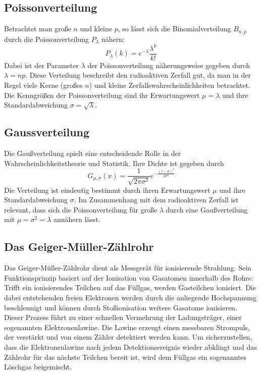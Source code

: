 \subsection{Poissonverteilung}
Betrachtet man große \(n\) und kleine \(p\), so lässt sich die Binomialverteilung \(B_{n,p}\) durch die Poissonverteilung \(P_\lambda\) nähern:
\begin{equation} \label{eq:poisson}
    P_\lambda(k) = e^{-\lambda} \frac{\lambda^k}{k!}
\end{equation}
Dabei ist der Parameter \(\lambda\) der Poissonverteilung näherungsweise gegeben durch \(\lambda = np\). Diese Verteilung beschreibt den radioaktiven Zerfall gut, da man in der Regel viele Kerne (großes \(n\)) und kleine Zerfallswahrscheinlichkeiten betrachtet. Die Kenngrößen der Poissonverteilung sind ihr Erwartungswert \(\mu = \lambda\) und ihre Standardabweichung \(\sigma = \sqrt{\lambda}\).

\subsection{Gaussverteilung}
Die Gaußverteilung spielt eine entscheidende Rolle in der Wahrscheinlichkeitstheorie und Statistik. Ihre Dichte ist gegeben durch
\begin{equation} \label{eq:gauss}
    G_{\mu,\sigma}(x) = \frac{1}{\sqrt{2\pi\sigma^2}} e^{-\frac{(x-\mu)^2}{2\sigma^2}}
\end{equation}
Die Verteilung ist eindeutig bestimmt durch ihren Erwartungswert \(\mu\) und ihre Standardabweichung \(\sigma\). Im Zusammenhang mit dem radioaktiven Zerfall ist relevant, dass sich die Poissonverteilung für große \(\lambda\) durch eine Gaußverteilung mit \(\mu = \sigma^2 = \lambda\) annähern lässt.

\FloatBarrier

\subsection{Das Geiger-Müller-Zählrohr}
Das Geiger-Müller-Zählrohr dient als Messgerät für ionisierende Strahlung. Sein Funktionsprinzip basiert auf der Ionisation von Gasatomen innerhalb des Rohrs: Trifft ein ionisierendes Teilchen auf das Füllgas, werden Gasteilchen ionisiert. Die dabei entstehenden freien Elektronen werden durch die anliegende Hochspannung beschleunigt und können durch Stoßionisation weitere Gasatome ionisieren. Dieser Prozess führt zu einer schnellen Vermehrung der Ladungsträger, einer sogenannten Elektronenlawine. Die Lawine erzeugt einen messbaren Strompuls, der verstärkt und von einem Zähler detektiert werden kann. Um sicherzustellen, dass die Elektronenlawine nach jedem Detektionsereignis wieder abklingt und das Zählrohr für das nächste Teilchen bereit ist, wird dem Füllgas ein sogenanntes Löschgas beigemischt.

